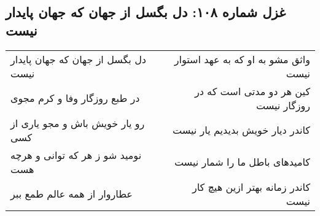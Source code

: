 \begin{center}
\section*{غزل شماره ۱۰۸: دل بگسل از جهان که جهان پایدار نیست}
\label{sec:108}
\begin{longtable}{l p{0.5cm} r}
دل بگسل از جهان که جهان پایدار نیست
&&
واثق مشو به او که به عهد استوار نیست
\\
در طبع روزگار وفا و کرم مجوی
&&
کین هر دو مدتی است که در روزگار نیست
\\
رو یار خویش باش و مجو یاری از کسی
&&
کاندر دیار خویش بدیدیم یار نیست
\\
نومید شو ز هر که توانی و هرچه هست
&&
کامیدهای باطل ما را شمار نیست
\\
عطاروار از همه عالم طمع ببر
&&
کاندر زمانه بهتر ازین هیچ کار نیست
\\
\end{longtable}
\end{center}
